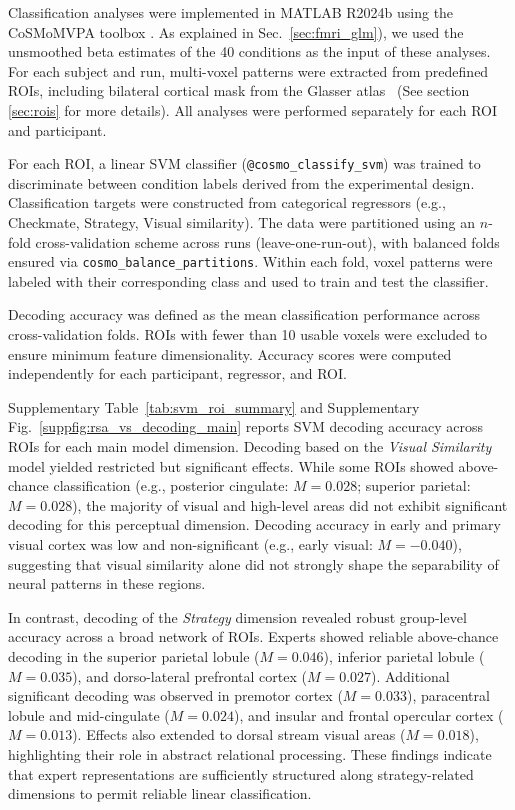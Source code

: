 Classification analyses were implemented in MATLAB R2024b using the CoSMoMVPA toolbox \cite{oosterhof2016cosmomvpa}. As explained in Sec.~\ref{sec:fmri_glm}), we used the unsmoothed beta estimates of the 40 conditions as the input of these analyses. For each subject and run, multi-voxel patterns were extracted from predefined ROIs, including bilateral cortical mask from the Glasser atlas~\cite{glasser2016multi} (See section \ref{sec:rois} for more details). All analyses were performed separately for each ROI and participant.

For each ROI, a linear SVM classifier (\texttt{@cosmo\_classify\_svm}) was trained to discriminate between condition labels derived from the experimental design. Classification targets were constructed from categorical regressors (e.g., Checkmate, Strategy, Visual similarity). The data were partitioned using an $n$-fold cross-validation scheme across runs (leave-one-run-out), with balanced folds ensured via \texttt{cosmo\_balance\_partitions}. Within each fold, voxel patterns were labeled with their corresponding class and used to train and test the classifier.

Decoding accuracy was defined as the mean classification performance across cross-validation folds. ROIs with fewer than 10 usable voxels were excluded to ensure minimum feature dimensionality. Accuracy scores were computed independently for each participant, regressor, and ROI.

Supplementary Table~\ref{tab:svm_roi_summary} and Supplementary Fig.~\ref{suppfig:rsa_vs_decoding_main} reports SVM decoding accuracy across ROIs for each main model dimension. Decoding based on the \emph{Visual Similarity} model yielded restricted but significant effects. While some ROIs showed above-chance classification (e.g., posterior cingulate: $M = 0.028$; superior parietal: $M = 0.028$), the majority of visual and high-level areas did not exhibit significant decoding for this perceptual dimension. Decoding accuracy in early and primary visual cortex was low and non-significant (e.g., early visual: $M = -0.040$), suggesting that visual similarity alone did not strongly shape the separability of neural patterns in these regions.

In contrast, decoding of the \emph{Strategy} dimension revealed robust group-level accuracy across a broad network of ROIs. Experts showed reliable above-chance decoding in the superior parietal lobule ($M = 0.046$), inferior parietal lobule ($M = 0.035$), and dorso-lateral prefrontal cortex ($M = 0.027$). Additional significant decoding was observed in premotor cortex ($M = 0.033$), paracentral lobule and mid-cingulate ($M = 0.024$), and insular and frontal opercular cortex ($M = 0.013$). Effects also extended to dorsal stream visual areas ($M = 0.018$), highlighting their role in abstract relational processing. These findings indicate that expert representations are sufficiently structured along strategy-related dimensions to permit reliable linear classification.

